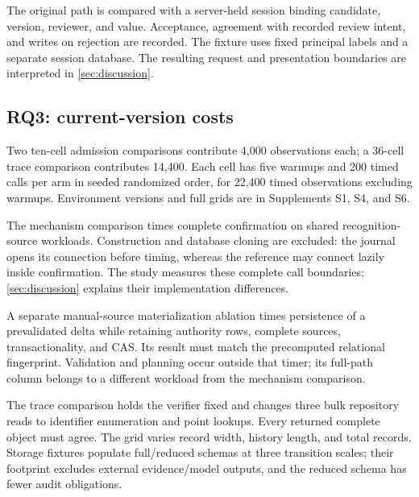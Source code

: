 The original path is compared with a server-held session binding candidate, version, reviewer, and value. Acceptance, agreement with recorded review intent, and writes on rejection are recorded. The fixture uses fixed principal labels and a separate session database. The resulting request and presentation boundaries are interpreted in \cref{sec:discussion}.

\subsection{RQ3: current-version costs}

Two ten-cell admission comparisons contribute 4,000 observations each; a 36-cell trace comparison contributes 14,400. Each cell has five warmups and 200 timed calls per arm in seeded randomized order, for 22,400 timed observations excluding warmups. Environment versions and full grids are in Supplements S1, S4, and S6.

The mechanism comparison times complete confirmation on shared recognition-source workloads. Construction and database cloning are excluded: the journal opens its connection before timing, whereas the reference may connect lazily inside confirmation. The study measures these complete call boundaries; \cref{sec:discussion} explains their implementation differences.

A separate manual-source materialization ablation times persistence of a prevalidated delta while retaining authority rows, complete sources, transactionality, and CAS. Its result must match the precomputed relational fingerprint. Validation and planning occur outside that timer; its full-path column belongs to a different workload from the mechanism comparison.

The trace comparison holds the verifier fixed and changes three bulk repository reads to identifier enumeration and point lookups. Every returned complete object must agree. The grid varies record width, history length, and total records. Storage fixtures populate full/reduced schemas at three transition scales; their footprint excludes external evidence/model outputs, and the reduced schema has fewer audit obligations.
